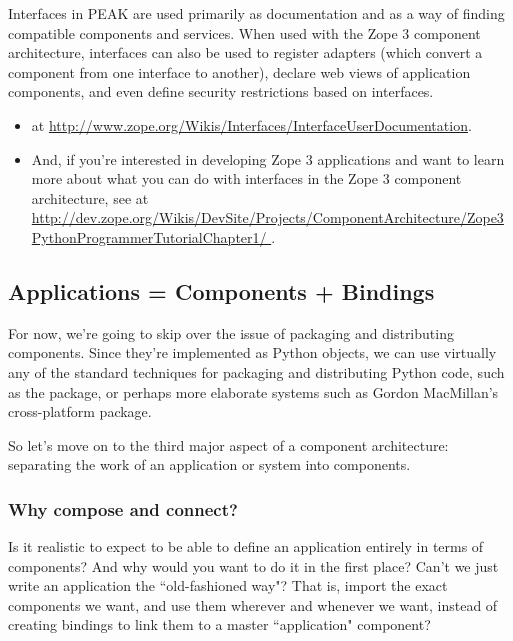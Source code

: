 Interfaces in PEAK are used primarily as documentation and as a way of finding
compatible components and services.  When used with the Zope 3 component
architecture, interfaces can also be used to register adapters (which convert
a component from one interface to another), declare web views of application
components, and even define security restrictions based on interfaces.  

\vfill
\begin{seealso}\begin{itemize}

\item {} at 
\url{http://www.zope.org/Wikis/Interfaces/InterfaceUserDocumentation}.  

\item And, if you're interested in developing Zope 3 applications and want to
learn more about what you can do with interfaces in the Zope 3 component
architecture, see  at \url{http://dev.zope.org/Wikis/DevSite/Projects/ComponentArchitecture/Zope3PythonProgrammerTutorialChapter1/
}.

\end{itemize}\end{seealso}
\vfill



\subsection{Applications = Components + Bindings}

For now, we're going to skip over the issue of packaging and distributing
components.  Since they're implemented as Python objects, we can use virtually
any of the standard techniques for packaging and distributing Python code,
such as the  package, or perhaps more elaborate systems such
as Gordon MacMillan's cross-platform  package.

So let's move on to the third major aspect of a component architecture:
separating the work of an application or system into components.


\subsubsection{Why compose and connect?}

Is it realistic to expect to be able to define an application entirely in
terms of components?  And why would you want to do it in the first place?
Can't we just write an application the ``old-fashioned way"?  That is,
import the exact components we want, and use them wherever and whenever
we want, instead of creating bindings to link them to a master ``application"
component?

